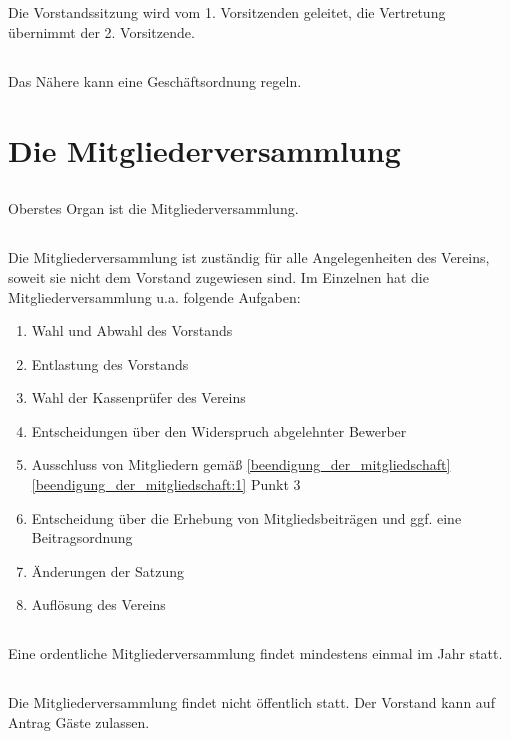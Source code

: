 \documentclass[12pt]{article}
\begin{document}
\subsection{}
Die Vorstandssitzung wird vom 1. Vorsitzenden geleitet, die Vertretung übernimmt der 2. Vorsitzende.
\subsection{}
Das Nähere kann eine Geschäftsordnung regeln.

\section{Die Mitgliederversammlung}
\subsection{}
Oberstes Organ ist die Mitgliederversammlung.
\subsection{}
Die Mitgliederversammlung ist zuständig für alle Angelegenheiten des Vereins, soweit sie nicht dem Vorstand zugewiesen sind. Im Einzelnen hat die Mitgliederversammlung u.a. folgende Aufgaben:
\begin{enumerate}
    \item Wahl und Abwahl des Vorstands
    \item Entlastung des Vorstands
    \item Wahl der Kassenprüfer des Vereins
    \item Entscheidungen über den Widerspruch abgelehnter Bewerber
    \item Ausschluss von Mitgliedern gemäß \ref{beendigung_der_mitgliedschaft} \ref{beendigung_der_mitgliedschaft:1} Punkt 3
    \item Entscheidung über die Erhebung von Mitgliedsbeiträgen und ggf. eine Beitragsordnung
    \item Änderungen der Satzung
    \item Auflösung des Vereins
\end{enumerate}
\subsection{}
Eine ordentliche Mitgliederversammlung findet mindestens einmal im Jahr statt.
\subsection{}
Die Mitgliederversammlung findet nicht öffentlich statt. Der Vorstand kann auf Antrag Gäste zulassen.
\end{document}
